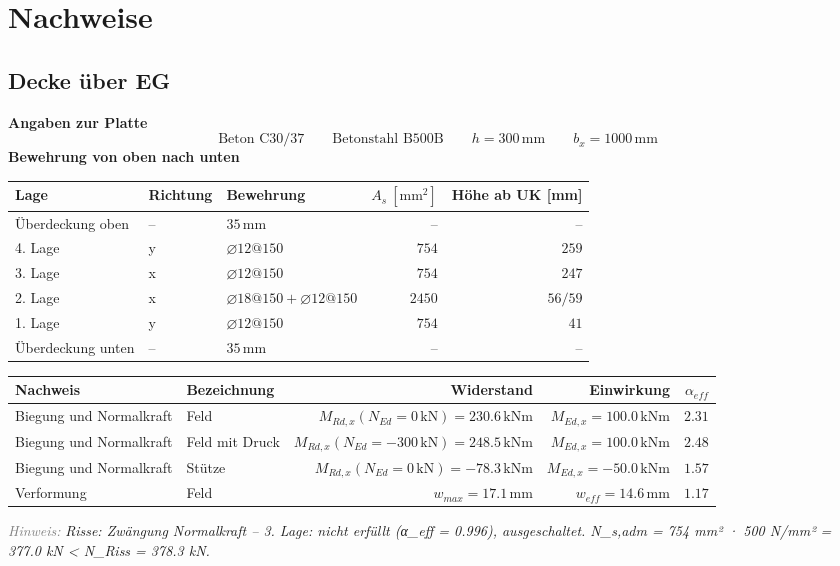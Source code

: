 \documentclass[11pt,a4paper]{article}
\newcommand{\hinweis}[2]{\par\noindent\textcolor{gray}{\textit{#1:}} \textit{#2}\par}
\begin{document}
\section{Nachweise}
\subsection{Decke über EG}
\noindent\textbf{Angaben zur Platte}
\begin{equation*}
\text{Beton C30/37} \qquad \text{Betonstahl B500B} \qquad h = 300\,\mathrm{mm} \qquad b_x = 1000\,\mathrm{mm}
\end{equation*}
\noindent\textbf{Bewehrung von oben nach unten}
\begin{longtable}{lllrr}
\hline
Lage & Richtung & Bewehrung & $A_s\ [\mathrm{mm}^2]$ & Höhe ab UK [mm] \\
\hline
\endhead
Überdeckung oben & – & $35\,\mathrm{mm}$ & – & – \\
4. Lage & y & $\varnothing 12@150$ & $754$ & $259$ \\
3. Lage & x & $\varnothing 12@150$ & $754$ & $247$ \\
2. Lage & x & $\varnothing 18@150 + \varnothing 12@150$ & $2450$ & $56 / 59$ \\
1. Lage & y & $\varnothing 12@150$ & $754$ & $41$ \\
Überdeckung unten & – & $35\,\mathrm{mm}$ & – & – \\
\hline
\end{longtable}
\begin{xltabular}{\linewidth}{>{\raggedright\arraybackslash}X>{\raggedright\arraybackslash}Xrrr}
\hline
Nachweis & Bezeichnung & Widerstand & Einwirkung & $\alpha_{eff}$ \\
\hline
\endhead
Biegung und Normalkraft & Feld & $M_{Rd,x}(N_{Ed} = 0\,\mathrm{kN}) = 230.6\,\mathrm{kNm}$ & $M_{Ed,x} = 100.0\,\mathrm{kNm}$ & $2.31$ \\
Biegung und Normalkraft & Feld mit Druck & $M_{Rd,x}(N_{Ed} = -300\,\mathrm{kN}) = 248.5\,\mathrm{kNm}$ & $M_{Ed,x} = 100.0\,\mathrm{kNm}$ & $2.48$ \\
Biegung und Normalkraft & Stütze & $M_{Rd,x}(N_{Ed} = 0\,\mathrm{kN}) = -78.3\,\mathrm{kNm}$ & $M_{Ed,x} = -50.0\,\mathrm{kNm}$ & $1.57$ \\
Verformung & Feld & $w_{max} = 17.1\,\mathrm{mm}$ & $w_{eff} = 14.6\,\mathrm{mm}$ & $1.17$ \\
\hline
\end{xltabular}
\hinweis{Hinweis}{Risse: Zwängung Normalkraft – 3. Lage: nicht erfüllt (α\_eff = 0.996), ausgeschaltet. N\_s,adm = 754 mm² · 500 N/mm² = 377.0 kN < N\_Riss = 378.3 kN.}
\end{document}
